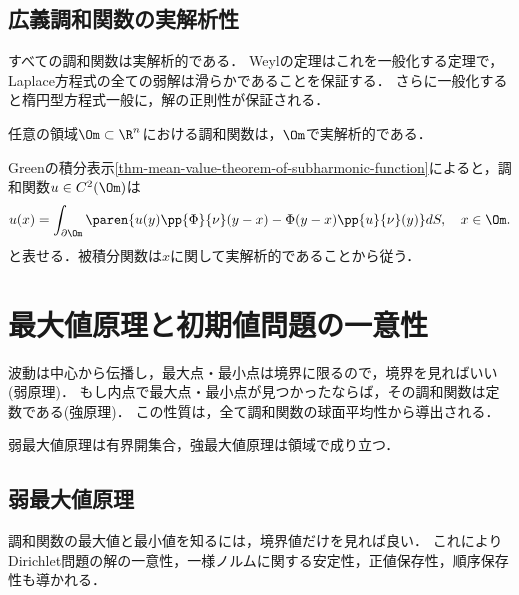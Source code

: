 \documentclass[uplatex,dvipdfmx]{jsreport}
\begin{document}
\subsection{広義調和関数の実解析性}

\begin{tcolorbox}[colframe=ForestGreen, colback=ForestGreen!10!white,breakable,colbacktitle=ForestGreen!40!white,coltitle=black,fonttitle=\bfseries\sffamily,
title=]
    すべての調和関数は実解析的である．
    Weylの定理はこれを一般化する定理で，Laplace方程式の全ての弱解は滑らかであることを保証する．
    さらに一般化すると楕円型方程式一般に，解の正則性が保証される．
\end{tcolorbox}

\begin{theorem}[調和関数は解析的である]
    任意の領域$\Om\subset\R^n$における調和関数は，$\Om$で実解析的である．
\end{theorem}
\begin{Proof}
    Greenの積分表示\ref{thm-mean-value-theorem-of-subharmonic-function}によると，調和関数$u\in C^2(\Om)$は
    \[u(x)=\int_{\partial\Om}\paren{u(y)\pp{\Phi}{\nu}(y-x)-\Phi(y-x)\pp{u}{\nu}(y)}dS,\quad x\in\Om.\]
    と表せる．被積分関数は$x$に関して実解析的であることから従う．
\end{Proof}

\section{最大値原理と初期値問題の一意性}


\begin{tcolorbox}[colframe=ForestGreen, colback=ForestGreen!10!white,breakable,colbacktitle=ForestGreen!40!white,coltitle=black,fonttitle=\bfseries\sffamily,
    title=]
    波動は中心から伝播し，最大点・最小点は境界に限るので，境界を見ればいい(弱原理)．
    もし内点で最大点・最小点が見つかったならば，その調和関数は定数である(強原理)．
    この性質は，全て調和関数の球面平均性から導出される．
\end{tcolorbox}

\begin{remark}
    弱最大値原理は有界開集合，強最大値原理は領域で成り立つ．
\end{remark}

\subsection{弱最大値原理}

\begin{tcolorbox}[colframe=ForestGreen, colback=ForestGreen!10!white,breakable,colbacktitle=ForestGreen!40!white,coltitle=black,fonttitle=\bfseries\sffamily,
title=]
    調和関数の最大値と最小値を知るには，境界値だけを見れば良い．
    これによりDirichlet問題の解の一意性，一様ノルムに関する安定性，正値保存性，順序保存性も導かれる．
\end{tcolorbox}
\end{document}

